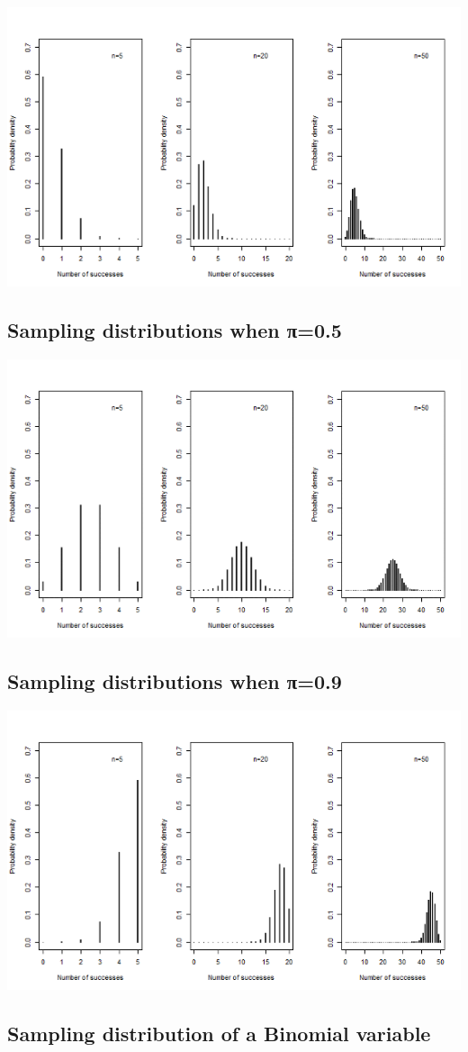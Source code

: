 \documentclass[
]{book}
\begin{document}
\includegraphics[width=0.5\linewidth]{./7_6}

\hypertarget{sampling-distributions-when-ux3c00.5}{%
\subsection{Sampling distributions when π=0.5}\label{sampling-distributions-when-ux3c00.5}}

\includegraphics[width=0.5\linewidth]{./7_7}

\hypertarget{sampling-distributions-when-ux3c00.9}{%
\subsection{Sampling distributions when π=0.9}\label{sampling-distributions-when-ux3c00.9}}

\includegraphics[width=0.5\linewidth]{./7_8}

\hypertarget{sampling-distribution-of-a-binomial-variable}{%
\subsection{Sampling distribution of a Binomial variable}\label{sampling-distribution-of-a-binomial-variable}}
\end{document}
